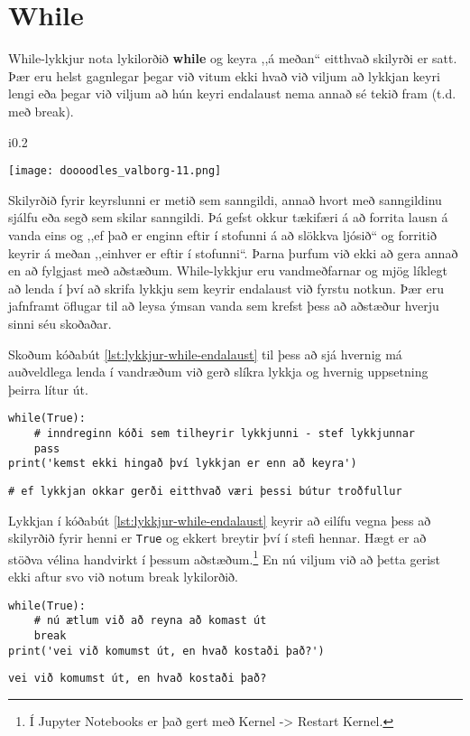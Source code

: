 \section{While}
While-lykkjur nota lykilorðið \textbf{while} og keyra ,,á meðan“ eitthvað skilyrði er satt.
Þær eru helst gagnlegar þegar við vitum ekki hvað við viljum að lykkjan keyri lengi eða þegar við viljum að hún keyri endalaust nema annað sé tekið fram (t.d. með break).

\begin{wrapfigure}{i}{0.2\textwidth} %
	\begin{center}
		\texttt{[image: doooodles\_valborg-11.png]}
	\end{center}
\end{wrapfigure}
Skilyrðið fyrir keyrslunni er metið sem sanngildi, annað hvort með sanngildinu sjálfu eða segð sem skilar sanngildi.
Þá gefst okkur tækifæri á að forrita lausn á vanda eins og ,,ef það er enginn eftir í stofunni á að slökkva ljósið“ og forritið keyrir á meðan ,,einhver er eftir í stofunni“.
Þarna þurfum við ekki að gera annað en að fylgjast með aðstæðum.
While-lykkjur eru vandmeðfarnar og mjög líklegt að lenda í því að skrifa lykkju sem keyrir endalaust við fyrstu notkun.
Þær eru jafnframt öflugar til að leysa ýmsan vanda sem krefst þess að aðstæður hverju sinni séu skoðaðar.

Skoðum kóðabút \ref{lst:lykkjur-while-endalaust} til þess að sjá hvernig má auðveldlega lenda í vandræðum við gerð slíkra lykkja og hvernig uppsetning þeirra lítur út.


\begin{lstlisting}[caption=while-lykkja sem keyrir að eilífu, label=lst:lykkjur-while-endalaust]
while(True):
	# inndreginn kóði sem tilheyrir lykkjunni - stef lykkjunnar
	pass
print('kemst ekki hingað því lykkjan er enn að keyra')
\end{lstlisting}
\lstset{style=uttak}
\begin{lstlisting}
# ef lykkjan okkar gerði eitthvað væri þessi bútur troðfullur
\end{lstlisting}
\lstset{style=venjulegt}
Lykkjan í kóðabút \ref{lst:lykkjur-while-endalaust} keyrir að eilífu vegna þess að skilyrðið fyrir henni er \texttt{True} og ekkert breytir því í stefi hennar.
Hægt er að stöðva vélina handvirkt í þessum aðstæðum.\footnote{Í Jupyter Notebooks er það gert með Kernel -> Restart Kernel.}
En nú viljum við að þetta gerist ekki aftur svo við notum break lykilorðið.


\begin{lstlisting}[caption=while-lykkja sem keyrir ekki að eilífu en hún gerir ekkert, label=lst:lykkjur-while-break]
while(True):
	# nú ætlum við að reyna að komast út
	break
print('vei við komumst út, en hvað kostaði það?')
\end{lstlisting}
\lstset{style=uttak}
\begin{lstlisting}
vei við komumst út, en hvað kostaði það?
\end{lstlisting}
\lstset{style=venjulegt}

